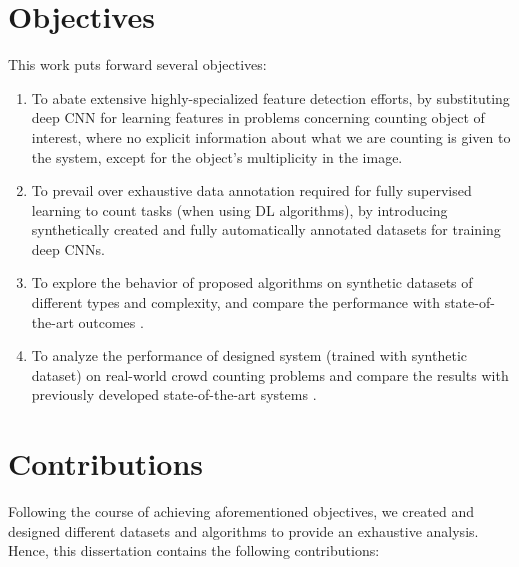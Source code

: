 \section{Objectives}
This work puts forward several objectives:
\begin{enumerate}

\item To abate extensive highly-specialized feature detection efforts, by substituting deep CNN for learning features in problems concerning counting object of interest, where no explicit information about what we are counting is given to the system, except for the object's multiplicity in the image.

\item To prevail over exhaustive data annotation required for fully supervised learning to count tasks (when using DL algorithms), by introducing synthetically created and fully automatically annotated datasets for training deep CNNs.   

\item To explore the behavior of proposed algorithms on synthetic datasets of different types and complexity, and compare the performance with state-of-the-art outcomes \cite{segui2015learning}.   

\item To analyze the performance of designed system (trained with synthetic dataset) on real-world crowd counting problems and compare the results with previously developed state-of-the-art systems \cite{chan2008privacy}.   
 

\end{enumerate}
\section{Contributions}
Following the course of achieving aforementioned objectives, we created and designed different datasets and algorithms to provide an exhaustive analysis. Hence, this dissertation contains the following contributions: 

